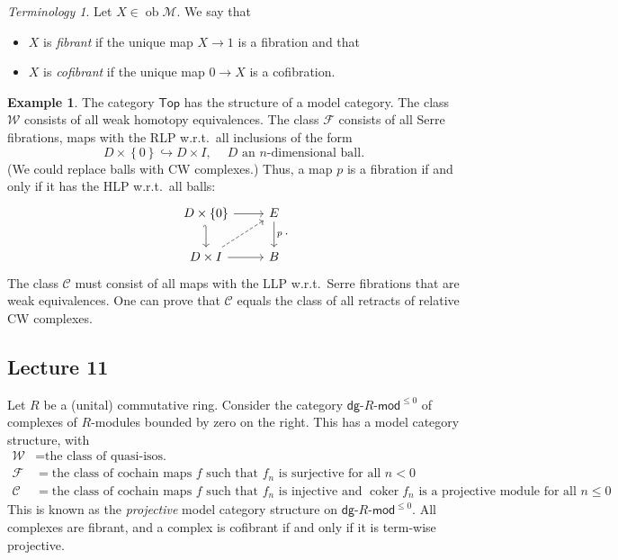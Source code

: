 \documentclass[10pt,letterpaper,cm]{nupset}
\theoremstyle{definition}
\newtheorem{exmp}[defn]{Example}
\theoremstyle{theorem}
\theoremstyle{remark}
\newtheorem*{term}{Terminology}
\newcommand{\1}{\mathbb{1}}
\newcommand{\cf}{\mathscr{C}}
\newcommand{\f}{\mathscr{F}}
\newcommand{\m}{\mathcal{M}}
\newcommand{\w}{\mathscr{W}}
\newcommand{\dg}{\mathsf{dg}}
\newcommand{\0}{\vec 0}
\DeclareMathOperator{\ob}{ob}
\DeclareMathOperator{\coker}{coker}
\newcommand{\bi}{\begin{itemize}}
\newcommand{\ei}{\end{itemize}}
\begin{document}
\smallskip

\begin{term} 
Let $X \in \ob{\m}$. We say that
\bi
\item  $X$ is \textit{fibrant} if the unique map $X \to 1$ is a fibration and that
\item $X$ is \textit{cofibrant} if the unique map $0 \to X$ is a cofibration. 
\ei
\end{term}

\begin{exmp}
The category $\mathsf{Top}$ has the structure of a model category. The class $\w$ consists of all weak homotopy equivalences. The class $\f$ consists of all Serre fibrations, maps with the RLP w.r.t.\ all inclusions of the form 
\[
D \times \left\{0\right\} \hookrightarrow D \times I, \ \quad \text{$D$ an $n$-dimensional ball}.
\] (We could replace balls with CW complexes.) Thus, a map $p$ is a fibration if and only if it has the HLP w.r.t.\ all balls:
\[
\begin{tikzcd}
	{D\times \left\{0\right\}} & E \\
	{D\times I} & B
	\arrow[hook', from=1-1, to=2-1]
	\arrow[from=1-1, to=1-2]
	\arrow[from=2-1, to=2-2]
	\arrow["p", from=1-2, to=2-2]
	\arrow[dashed, from=2-1, to=1-2]
\end{tikzcd}
.\]
The class $\cf$ must consist of all maps with the LLP w.r.t.\ Serre fibrations that are weak equivalences. One can prove that $\cf$ equals the class of all retracts of relative CW complexes.  
\end{exmp}

\subsection{Lecture 11}

Let $R$ be a (unital) commutative ring. Consider the category $\dg{\text{-}}R{\text{-}}\mathsf{mod}^{\leq 0}$ of complexes of $R$-modules bounded by zero on the right. This has a model category structure, with
\begin{align*}
\w & = \text{the class of quasi-isos.}
\\ \f & = \text{the class of cochain maps $f$ such that $f_n$ is surjective for all $n<0$}
\\ \cf & =  \text{the class of cochain maps $f$ such that $f_n$ is injective  and $\coker{f_n}$ is a projective module for all $n\leq 0$}
. 
\end{align*}
This is known as the \textit{projective} model category structure on $\dg{\text{-}}R{\text{-}}\mathsf{mod}^{\leq 0}$. All complexes are fibrant, and a complex is cofibrant if and only if it is term-wise projective.
\end{document}
